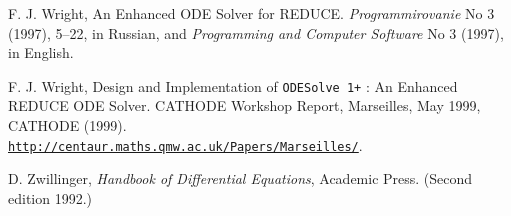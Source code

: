 \documentclass[a4paper]{article} %
\newcommand{\ODESolve}[1]{\texttt{ODESolve\,#1}}
\begin{document}
\begin{thebibliography}{99}
 F. J. Wright, An Enhanced ODE Solver for REDUCE.
\textit{Programmirovanie} No 3 (1997), 5--22, in Russian, and
\textit{Programming and Computer Software} No 3 (1997), in English.

 F. J. Wright, Design and Implementation of
\ODESolve{1+} : An Enhanced REDUCE ODE Solver.  CATHODE Workshop
Report, Marseilles, May 1999, CATHODE (1999). \\
\href{http://centaur.maths.qmw.ac.uk/Papers/Marseilles/}%
{\texttt{http://centaur.maths.qmw.ac.uk/Papers/Marseilles/}}.

 D. Zwillinger, \textit{Handbook of Differential
Equations}, Academic Press.  (Second edition 1992.)

\end{thebibliography}
\end{document}

